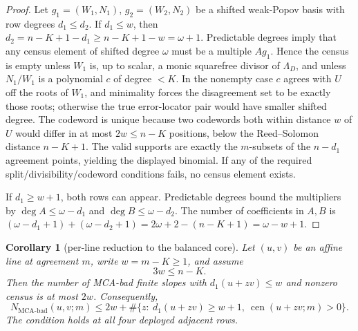 \documentclass[11pt]{article}
\newtheorem{corollary}[corollary]{Corollary}
\theoremstyle{definition}
\theoremstyle{remark}
\providecommand{\Cen}{\operatorname{cen}}
\begin{document}
\begin{proof}
Let \(g_1=(W_1,N_1)\), \(g_2=(W_2,N_2)\) be a shifted weak-Popov basis with row degrees \(d_1\le d_2\).  If \(d_1\le w\), then \(d_2=n-K+1-d_1\ge n-K+1-w=\omega+1\).  Predictable degrees imply that any census element of shifted degree \(\omega\) must be a multiple \(Ag_1\).  Hence the census is empty unless \(W_1\) is, up to scalar, a monic squarefree divisor of \(\Lambda_D\), and unless \(N_1/W_1\) is a polynomial \(c\) of degree \(<K\).  In the nonempty case \(c\) agrees with \(U\) off the roots of \(W_1\), and minimality forces the disagreement set to be exactly those roots; otherwise the true error-locator pair would have smaller shifted degree.  The codeword is unique because two codewords both within distance \(w\) of \(U\) would differ in at most \(2w\le n-K\) positions, below the Reed--Solomon distance \(n-K+1\).  The valid supports are exactly the \(m\)-subsets of the \(n-d_1\) agreement points, yielding the displayed binomial.  If any of the required split/divisibility/codeword conditions fails, no census element exists.

If \(d_1\ge w+1\), both rows can appear.  Predictable degrees bound the multipliers by \(\deg A\le\omega-d_1\) and \(\deg B\le\omega-d_2\).  The number of coefficients in \(A,B\) is \((\omega-d_1+1)+(\omega-d_2+1)=2\omega+2-(n-K+1)=\omega-w+1\).
\end{proof}

\begin{corollary}[per-line reduction to the balanced core]\label{cor:capfr1-balanced-line}
Let $(u,v)$ be an affine line at agreement $m$, write $w=m-K\ge1$, and assume
\[
        3w\le n-K.
\]
Then the number of MCA-bad finite slopes with $d_1(u+zv)\le w$ and nonzero census is at most $2w$.  Consequently,
\[
        N_{\mathrm{MCA\text{-}bad}}(u,v;m)
        \le
        2w+\#\{z:\ d_1(u+zv)\ge w+1,\ \Cen(u+zv;m)>0\}.
\]
The condition holds at all four deployed adjacent rows.
\end{corollary}
\end{document}

